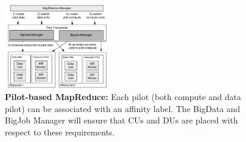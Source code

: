\documentclass{acm_proc_article-sp}
\newcommand{\upp}{\vspace*{-0.5em}}
\begin{document}
\begin{figure}[htbp]
	\centering
	\includegraphics[width=0.4\textwidth]{figures/mapreduce-pilotdata.pdf}
	\caption{\textbf{Pilot-based MapReduce:} Each pilot (both compute and data 
	pilot) can be associated with an affinity label. The BigData and BigJob 
	Manager will ensure that CUs and DUs are placed with respect to these 
	requirements.\upp}
	\label{fig:figures_mapreduce-pilotdata}
\end{figure}
\end{document}
